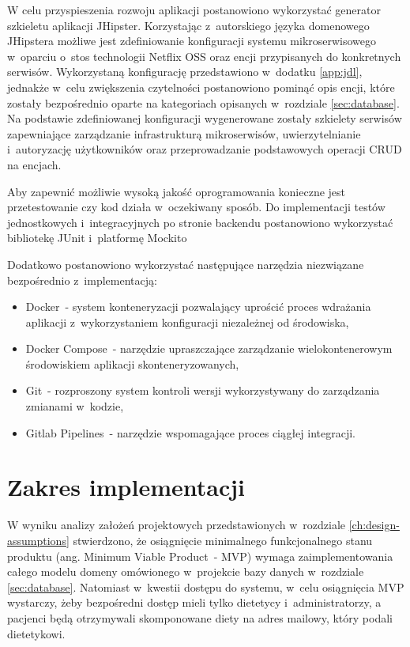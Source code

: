 \par
W celu przyspieszenia rozwoju aplikacji postanowiono wykorzystać generator szkieletu aplikacji JHipster\cite{tech:jhipster}.
Korzystając z~autorskiego języka domenowego JHipstera możliwe jest zdefiniowanie konfiguracji systemu mikroserwisowego w~oparciu o~stos technologii Netflix OSS oraz encji przypisanych do konkretnych serwisów.
Wykorzystaną konfigurację przedstawiono w~dodatku \ref{app:jdl}, jednakże w~celu zwiększenia czytelności postanowiono pominąć opis encji, które zostały bezpośrednio oparte na kategoriach opisanych w~rozdziale \ref{sec:database}.
Na podstawie zdefiniowanej konfiguracji wygenerowane zostały szkielety serwisów zapewniające zarządzanie infrastrukturą mikroserwisów, uwierzytelnianie i~autoryzację użytkowników oraz przeprowadzanie podstawowych operacji CRUD na encjach.

\par
Aby zapewnić możliwie wysoką jakość oprogramowania konieczne jest przetestowanie czy kod działa w~oczekiwany sposób.
Do implementacji testów jednostkowych i~integracyjnych po stronie backendu postanowiono wykorzystać bibliotekę JUnit\cite{tech:junit} i~platformę Mockito\cite{tech:mockito}
\par
Dodatkowo postanowiono wykorzystać następujące narzędzia niezwiązane bezpośrednio z~implementacją:
\begin{itemize}
    \item Docker\cite{tech:docker}~- system konteneryzacji pozwalający uprościć proces wdrażania aplikacji z~wykorzystaniem konfiguracji niezależnej od środowiska,
    \item Docker Compose\cite{tech:docker-compose}~- narzędzie upraszczające zarządzanie wielokontenerowym środowiskiem aplikacji skonteneryzowanych,
    \item Git\cite{tech:git}~- rozproszony system kontroli wersji wykorzystywany do zarządzania zmianami w~kodzie,
    \item Gitlab Pipelines\cite{tech:gitlab-pipelines}~- narzędzie wspomagające proces ciągłej integracji.
\end{itemize}

\section{Zakres implementacji}\label{sec:implementation-scope}

W wyniku analizy założeń projektowych przedstawionych w~rozdziale \ref{ch:design-assumptions} stwierdzono,
że osiągnięcie minimalnego funkcjonalnego stanu produktu (ang. Minimum Viable Product~- MVP)
wymaga zaimplementowania całego modelu domeny omówionego w~projekcie bazy danych w~rozdziale \ref{sec:database}.
Natomiast w~kwestii dostępu do systemu, w~celu osiągnięcia MVP wystarczy, żeby bezpośredni dostęp mieli tylko dietetycy i~administratorzy,
a pacjenci będą otrzymywali skomponowane diety na adres mailowy, który podali dietetykowi.


